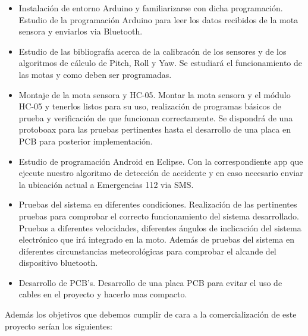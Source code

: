 		\begin{itemize}
			\item Instalaci\'on de entorno Arduino y familiarizarse con dicha programaci\'on. Estudio de la programaci\'on Arduino para leer los datos recibidos de la mota sensora y enviarlos via Bluetooth.
			
			\item Estudio de las bibliograf\'ia acerca de la calibrac\'on de los sensores y de los algoritmos de c\'alculo de Pitch, Roll y Yaw. Se estudiar\'a el funcionamiento de las motas y como deben ser programadas.
			
			\item Montaje de la mota sensora y HC-05. Montar la mota sensora y el m\'odulo HC-05 y tenerlos listos para su uso, realizaci\'on de programas b\'asicos de prueba y verificaci\'on de que funcionan correctamente. Se dispondr\'a de una protoboax para las pruebas pertinentes hasta el desarrollo de una placa en PCB para posterior implementaci\'on.
			
			\item Estudio de programaci\'on Android en Eclipse. Con la correspondiente app que ejecute nuestro algoritmo de detecci\'on de accidente y en caso necesario enviar la ubicaci\'on actual a Emergencias 112 via SMS.
			
			\item Pruebas del sistema en diferentes condiciones. Realizaci\'on de las pertinentes pruebas para comprobar el correcto funcionamiento del sistema desarrollado. Pruebas a diferentes velocidades, diferentes \'angulos de inclicaci\'on del sistema electr\'onico que ir\'a integrado en la moto. Adem\'as de pruebas del sistema en diferentes circunstancias meteorol\'ogicas para comprobar el alcande del dispositivo bluetooth.
			
			\item Desarrollo de PCB's. Desarrollo de una placa PCB para evitar el uso de cables en el proyecto y hacerlo mas compacto.
			
		\end{itemize}
		
		Adem\'as los objetivos que debemos cumplir de cara a la comercializaci\'on de este proyecto ser\'ian los siguientes:
		
